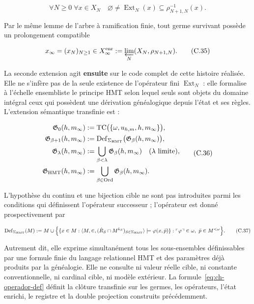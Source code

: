 \[
 \forall N\ge0\;\forall x\in X_N\quad
 \varnothing\ne\operatorname{Ext}_N(x)
 \subseteq\rho_{N+1,N}^{-1}(x).
\tag{C.34}\label{eq:ch-extension-no-vacia}
\]

Par le même lemme de l’arbre à ramification finie, tout germe survivant
possède un prolongement compatible

\[
 x_\infty=(x_N)_{N\ge1}\in
 X_\infty^{\rm enr}:=\varprojlim_N(X_N,\rho_{N+1,N}).
\tag{C.35}\label{eq:ch-limite-inverso}
\]

La seconde extension agit \textbf{ensuite} sur le code complet de cette
histoire réalisée.
Elle ne s’infère pas de la seule existence de l’opérateur fini
\(\operatorname{Ext}_N\) : elle formalise à l’échelle ensembliste le principe HMT selon
lequel seuls sont objets du domaine intégral ceux qui possèdent une dérivation
généalogique depuis l’état et ses règles. L’extension sémantique transfinie
est :

\[
 \begin{aligned}
  \mathfrak G_0(h,m_\infty)
  &:=\operatorname{TC}\bigl(\{\omega,u_{h,m},h,m_\infty\}\bigr),\\
  \mathfrak G_{\beta+1}(h,m_\infty)
  &:=\operatorname{Def}_{\Sigma_{\rm HMT}}
       \bigl(\mathfrak G_\beta(h,m_\infty)\bigr),\\
  \mathfrak G_\lambda(h,m_\infty)
  &:=\bigcup_{\beta<\lambda}\mathfrak G_\beta(h,m_\infty)
       \quad(\lambda\text{ limite}),\\
  \mathfrak G_{\rm HMT}(h,m_\infty)
  &:=\bigcup_{\beta\in\operatorname{Ord}}
       \mathfrak G_\beta(h,m_\infty).
 \end{aligned}
\tag{C.36}\label{eq:ch-clausura-transfinita}
\]

L'hypothèse du continu et une bijection cible ne sont pas introduites parmi les conditions qui définissent l'opérateur successeur ; l'opérateur est donné prospectivement par

\[
 \operatorname{Def}_{\Sigma_{\rm HMT}}(M)
 :=M\cup
 \Bigl\{
   \{x\in M:\langle M,\in,
       (\dot R_S\cap M^{k_S})_{S\in\Sigma_{\rm HMT}}\rangle
       \models\varphi(x,\bar p)\}:
   \ulcorner\varphi\urcorner\in\omega,
   \ \bar p\in M^{<\omega}
 \Bigr\}.
\tag{C.37}\label{eq:ch-operador-def}
\]

Autrement dit, elle exprime simultanément tous les sous-ensembles définissables par une formule finie du langage relationnel HMT et des paramètres déjà produits par la généalogie. Elle ne consulte ni valeur réelle cible, ni constante conventionnelle, ni cardinal cible, ni modèle extérieur. La formule~\eqref{eq:ch-operador-def} définit la clôture transfinie sur les germes, les opérateurs, l'état enrichi, le registre et la double projection construits précédemment.

